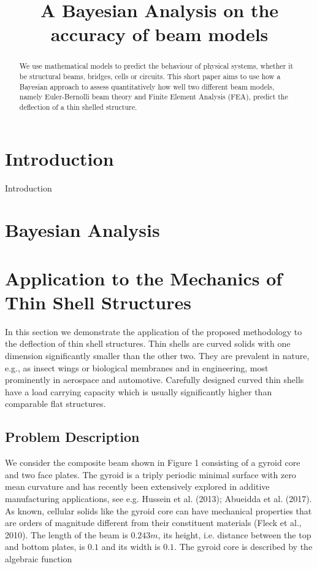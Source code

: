 \documentclass{article}
\title{A Bayesian Analysis on the accuracy of beam models}
\begin{document}
\maketitle

\begin{abstract}
	We use mathematical models to predict the behaviour of physical systems, whether it be structural beams, bridges, cells or circuits. This short paper aims to use how a Bayesian approach to assess quantitatively how well two different beam models, namely Euler-Bernolli beam theory and Finite Element Analysis (FEA), predict the deflection of a thin shelled structure.
\end{abstract}


\section{Introduction}
Introduction

\section{Bayesian Analysis}
\label{sec:headings}

\section{Application to the Mechanics of Thin Shell Structures}

In this section we demonstrate the application of the proposed methodology to the deflection of thin shell structures. Thin shells are curved solids with one dimension significantly smaller than the other two. They are prevalent in nature, e.g., as insect wings or biological membranes and in engineering, most prominently in aerospace and automotive. Carefully designed curved thin shells have a load carrying capacity which is usually significantly higher than comparable flat structures.\\

\subsection{Problem Description}
We consider the composite beam shown in Figure 1 consisting of a gyroid core and two face plates. The gyroid is a triply periodic minimal surface with zero mean curvature and has recently been extensively explored in additive manufacturing applications, see e.g. Hussein et al. (2013); Abueidda et al. (2017). As known, cellular solids like the gyroid core can have mechanical properties that are orders of magnitude different from their constituent materials (Fleck et al., 2010). The length of the beam is $0.243m$, its height, i.e. distance between the top and bottom plates, is $0.1$ and its width is $0.1$. The gyroid core is described by the algebraic function\\
\end{document}
